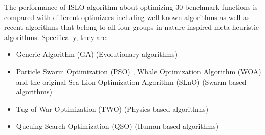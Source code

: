 \documentclass[../main.tex]{subfiles}
\begin{document}
The performance of ISLO algorithm about optimizing 30 benchmark functions is compared with different optimizers including well-known algorithms as well as recent algorithms that belong to all four groups in nature-inspired meta-heuristic algorithms. Specifically, they are: 
\begin{itemize}
\item Generic Algorithm (GA) \cite{whitley1994genetic} (Evolutionary algorithms)
\item Particle Swarm Optimization (PSO) \cite{kennedy2010particle}, Whale Optimization Algorithm (WOA) \cite{mirjalili2016whale} and the original Sea Lion Optimization Algorithm (SLnO) \cite{masadeh2019sea} (Swarm-based algorithms)
\item Tug of War Optimization (TWO) \cite{kaveh2016novel} (Physics-based algorithms)
\item Queuing Search Optimization (QSO) \cite{zhang2018queuing} (Human-based algorithms)
\end{itemize}
\end{document}
